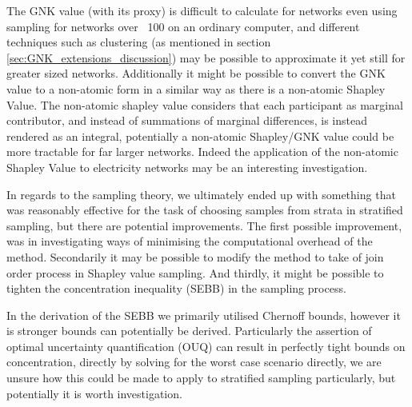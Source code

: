 The GNK value (with its proxy) is difficult to calculate for networks even using sampling for networks over ~100 on an ordinary computer, and different techniques such as clustering (as mentioned in section \ref{sec:GNK_extensions_discussion}) may be possible to approximate it yet still for greater sized networks.
Additionally it might be possible to convert the GNK value to a non-atomic form in a similar way as there is a non-atomic Shapley Value.
The non-atomic shapley value considers that each participant as marginal contributor, and instead of summations of marginal differences, is instead rendered as an integral, potentially a non-atomic Shapley/GNK value could be more tractable for far larger networks.
Indeed the application of the non-atomic Shapley Value to electricity networks may be an interesting investigation.

In regards to the sampling theory, we ultimately ended up with something that was reasonably effective for the task of choosing samples from strata in stratified sampling, but there are potential improvements.
The first possible improvement, was in investigating ways of minimising the computational overhead of the method.
Secondarily it may be possible to modify the method to take of join order process in Shapley value sampling.
And thirdly, it might be possible to tighten the concentration inequality (SEBB) in the sampling process.

In the derivation of the SEBB we primarily utilised Chernoff bounds, however it is stronger bounds can potentially be derived.
Particularly the assertion of optimal uncertainty quantification (OUQ) can result in perfectly tight bounds on concentration, directly by solving for the worst case scenario directly, we are unsure how this could be made to apply to stratified sampling particularly, but potentially it is worth investigation.\citep{OUQ1,doi:10.1137/13094712X}








